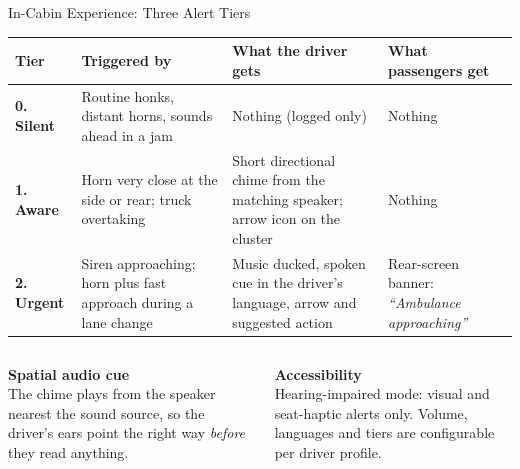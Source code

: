 \documentclass[aspectratio=169,10pt,t,xcolor=table]{beamer}
\renewcommand{\arraystretch}{1.18}
\begin{document}
\begin{frame}{In-Cabin Experience: Three Alert Tiers}
\small\renewcommand{\arraystretch}{1.05}
\begin{tabularx}{\textwidth}{@{}p{1.9cm}p{4.0cm}YY@{}}
\toprule
\textbf{Tier} & \textbf{Triggered by} & \textbf{What the driver gets} & \textbf{What passengers get} \\
\midrule
\textcolor{muted}{\textbf{0. Silent}} & Routine honks, distant horns, sounds ahead in a jam & Nothing (logged only) & Nothing \\
\textcolor{sky}{\textbf{1. Aware}} & Horn very close at the side or rear; truck overtaking & Short directional chime from the matching speaker; arrow icon on the cluster & Nothing \\
\textcolor{alert}{\textbf{2. Urgent}} & Siren approaching; horn plus fast approach during a lane change & Music ducked, spoken cue in the driver's language, arrow and suggested action & Rear-screen banner: \emph{``Ambulance approaching''} \\
\bottomrule
\end{tabularx}
\vspace{2pt}
\footnotesize
\begin{columns}[T]
\begin{column}{0.48\textwidth}
\textbf{Spatial audio cue}\\
The chime plays from the speaker nearest the sound source, so the driver's ears point the right way \emph{before} they read anything.
\end{column}
\begin{column}{0.48\textwidth}
\textbf{Accessibility}\\
Hearing-impaired mode: visual and seat-haptic alerts only. Volume, languages and tiers are configurable per driver profile.
\end{column}
\end{columns}
\end{frame}
\end{document}

